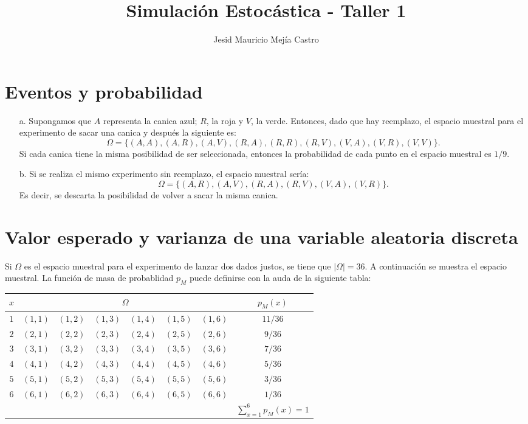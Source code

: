 \documentclass[11pt,letterpaper]{article}
\title{Simulación Estocástica - Taller 1}
\author{Jesid Mauricio Mejía Castro}
\begin{document}
	\maketitle
	\section{Eventos y probabilidad}
	\begin{itemize}
		\item[a.] Supongamos que $A$ representa la canica azul; $R$, la roja y $V$, la verde. Entonces, dado que hay reemplazo, el espacio muestral para el experimento	de sacar una canica y después la siguiente es:
		\[
		\Omega = \{(A, A), (A, R), (A, V), (R, A), (R, R), (R, V), (V, A), (V, R), (V,
			V)\}.
		\]
		Si cada canica tiene la misma posibilidad de ser seleccionada, entonces la
		probabilidad de cada punto en el espacio muestral es $1/9$.
		\item[b.] Si se realiza el mismo experimento sin reemplazo, el espacio muestral sería:
		\[
		\Omega = \{(A, R), (A, V), (R, A), (R, V), (V, A), (V, R)\}.
		\]
		Es decir, se descarta la posibilidad de volver a sacar la misma canica.
	\end{itemize}
	
	\section{Valor esperado y varianza de una variable aleatoria discreta}
	Si $\Omega$ es el espacio muestral para el experimento de lanzar dos dados justos, se tiene que $|\Omega| = 36$. A continuación se muestra el espacio muestral. La función de masa de probablidad $p_M$ puede definirse con la auda de la siguiente tabla:
	
	\begin{center}
		\begin{tabular}{ | c | c c c c c c | c |} \hline
			$x$ & \multicolumn{6}{c}{$\Omega$} & $p_M(x)$ \\ \hline
			$1$ & $(1, 1)$ & $(1, 2)$ & $(1, 3)$ & $(1, 4)$ & $(1, 5)$ & $(1, 6)$ & $11/36$ \\
			$2$ & $(2, 1)$ & $(2, 2)$ & $(2, 3)$ & $(2, 4)$ & $(2, 5)$ & $(2, 6)$ & $9/36$ \\
			$3$ & $(3, 1)$ & $(3, 2)$ & $(3, 3)$ & $(3, 4)$ & $(3, 5)$ & $(3, 6)$ & $7/36$ \\
			$4$ & $(4, 1)$ & $(4, 2)$ & $(4, 3)$ & $(4, 4)$ & $(4, 5)$ & $(4, 6)$ & $5/36$ \\
			$5$ & $(5, 1)$ & $(5, 2)$ & $(5, 3)$ & $(5, 4)$ & $(5, 5)$ & $(5, 6)$ & $3/36$ \\
			$6$ & $(6, 1)$ & $(6, 2)$ & $(6, 3)$ & $(6, 4)$ & $(6, 5)$ & $(6, 6)$  & $1/36$ \\ \hline
			&  &  &  &  &  &  & $\sum_{x=1}^{6} p_M(x)=1$ \\ \hline
		\end{tabular}
	\end{center}
	
\end{document}
